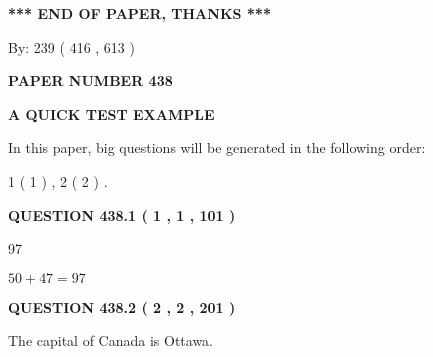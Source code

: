 \documentclass[12pt]{article}
\begin{document}
\vspace{1.0in} 
{\textbf{\large{ *** END OF PAPER, THANKS *** }}} 
   
   
\hspace{1.0in} By: 
 239 ( 416 ,  613 )
   
   
   
   
\newpage 
\setcounter{page}{ 
   438001 } 
   
   
   
   
 {\textbf{ \Large{ PAPER NUMBER  438  }}}
   
   
\vspace{0.2in}
   
   
   
   
   
   
 \vspace{0.2in}
{\LARGE {\textbf{ A QUICK TEST EXAMPLE}}}
   
   
   
\vspace{0.2in}
   
In this paper, big questions will be generated in the following order: 
   
   
   1 ( 1 )
 ,
   2 ( 2 )
 .
  
\vspace{0.2in}
  
{\textbf{\Large{QUESTION
438.1 
 ( 1 , 1 , 101 )
}}}
  
  
 
 
\noindent{}

97
 
 
 
 
\noindent{}

$ %
50 +  %
47=   %
97$
 
 
  
\vspace{0.2in}
  
{\textbf{\Large{QUESTION
438.2 
 ( 2 , 2 , 201 )
}}}
  
  
 
 
\noindent{}
 
 
The capital of Canada is Ottawa.
 
\end{document}

